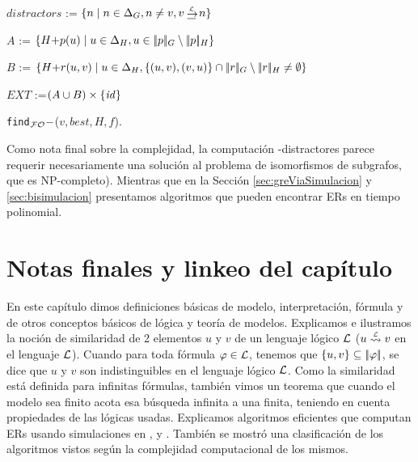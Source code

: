 \begin{megaalgorithm}[H] 
{} 

$\mathit{distractors}$ := $\cset{n \mid n \in \Delta_G, n \neq v , v \simul{\+L} n}$\;


 $A$ := $\{H {+} p(u) \mid u \in \Delta_H, u \in |\!|p|\!|_G  \setminus |\!|p|\!|_H\}$\;

 $B$ := $\{H {+} r(u,v) \mid u \in \Delta_H, \{(u,v),(v,u)\}\cap |\!|r|\!|_G \setminus |\!|r|\!|_H\not=\emptyset\}$\;

 $EXT$ :=$(A \cup B) \times \{\mathit{id}\}$\;
%
%
 
\;

\caption{\small \texttt{find}$_\mathcal{FO}-$($v, \mathit{best},H,f$).}\label{alg:find}
\end{megaalgorithm}

Como nota final sobre la complejidad, la computaci\'on
\EPFOL-distractores parece requerir necesariamente una soluci\'on al problema de isomorfismos de subgrafos, que es NP-completo). Mientras que en la Secci\'on \ref{sec:greViaSimulacion} y \ref{sec:bisimulacion} presentamos algoritmos que pueden encontrar ERs en tiempo polinomial.


\section{Notas finales y linkeo del cap\'itulo}
\label{sec:notasFinales}

En este cap\'itulo dimos definiciones b\'asicas de modelo, interpretaci\'on, f\'ormula y de otros conceptos b\'asicos de l\'ogica y teor\'ia de modelos. Explicamos e ilustramos la noci\'on de similaridad de 2 elementos $u$ y $v$ de un lenguaje l\'ogico $\mathcal{L}$ ($u \simil{\+L} v$ en el lenguaje $\mathcal{L}$). Cuando para toda f\'ormula $\varphi \in \mathcal{L}$, tenemos que $\{u,v\} \subseteq |\!|\varphi|\!|$,  se dice que $u$ y $v$ son indistinguibles en el lenguaje l\'ogico $\mathcal{L}$. Como la similaridad est\'a definida para infinitas f\'ormulas, tambi\'en vimos un teorema que cuando el modelo sea finito acota esa b\'usqueda
infinita a una finita, teniendo en cuenta propiedades de las l\'ogicas usadas. Explicamos algoritmos eficientes que computan ERs usando simulaciones en \FOL, \ALC y \EL. Tambi\'en se mostr\'o una clasificaci\'on de los algoritmos vistos seg\'un la complejidad computacional de los mismos. 

